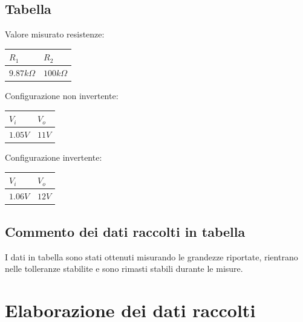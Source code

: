 \documentclass[12pt]{article}
\begin{document}
\subsection{Tabella}
Valore misurato resistenze:\\
\begin{center}
        \begin{tabular}{|p{2cm}|p{2cm}|}
            \hline
            \rowcolor{RoyalBlue} $R_1$ & $R_2$ \\
            \hline
            \rowcolor{CornflowerBlue} $9.87k\Omega$ & $100k\Omega$  \\ 
            \hline
        \end{tabular}
        \label{Valore resistenze}
\end{center}
\noindent
Configurazione non invertente:\\
\begin{center}
    \begin{tabular}{|p{2cm} |p{2cm}|}
        \hline
        \rowcolor{RoyalBlue} $V_i$ & $V_o$  \\
        \hline
        \rowcolor{CornflowerBlue} $1.05V$ & $11V$  \\ 
        \hline
    \end{tabular}
    \label{Valore resistenze}
\end{center}

\noindent
Configurazione invertente:\\
\begin{center}
    \begin{tabular}{|p{2cm} |p{2cm}|}
        \hline
        \rowcolor{RoyalBlue} $V_i$ & $V_o$  \\
        \hline
        \rowcolor{CornflowerBlue} $1.06V$ & $12V$  \\ 
        \hline
    \end{tabular}
    \label{Valore resistenze}
\end{center}
\subsection{Commento dei dati raccolti in tabella}
I dati in tabella sono stati ottenuti misurando le grandezze riportate, rientrano nelle
tolleranze stabilite e sono rimasti stabili durante le misure.\\
\newpage
\section{Elaborazione dei dati raccolti}
\end{document}
